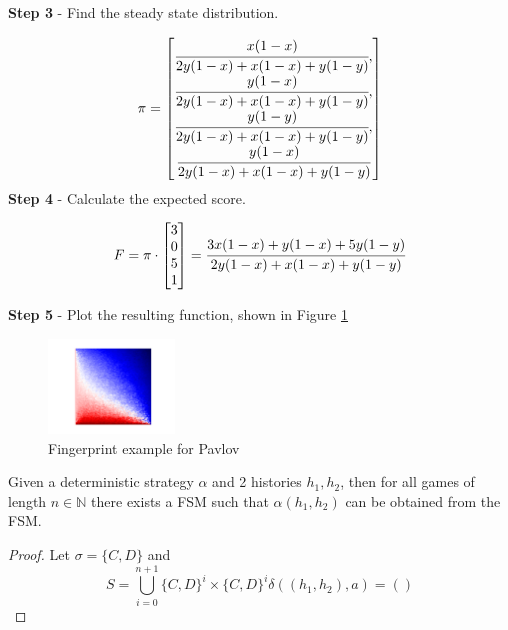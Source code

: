 \textbf{Step 3} - Find the steady state distribution.

\begin{equation}\label{eq:steady_state}
%
\pi =
\begin{bmatrix}
\cfrac{x (1 - x)}{2y(1-x) + x(1-x) + y(1-y)}, \\
\cfrac{y (1 - x)}{2y(1-x) + x(1-x) + y(1-y)}, \\
\cfrac{y (1 - y)}{2y(1-x) + x(1-x) + y(1-y)}, \\
\cfrac{y (1 - x)}{2y(1-x) + x(1-x) + y(1-y)}
\end{bmatrix}
\end{equation}
\textbf{Step 4} - Calculate the expected score.

\begin{equation}
F = \pi \cdot
\begin{bmatrix}
3 \\
0 \\
5 \\
1
\end{bmatrix}
=
\cfrac{3x(1-x) + y(1-x) + 5y(1-y)}{2y(1-x) + x(1-x) + y(1-y)}
\end{equation}

\textbf{Step 5} - Plot the resulting function, shown in Figure \ref{fig:pavlov_fing_ex}

\begin{figure}[htbp!]
\centering
\includegraphics[width = 0.3\textwidth]{../img/Numerical/Win-Stay-Lose-Shift}
\caption{Fingerprint example for Pavlov}
\label{fig:pavlov_fing_ex}
\end{figure}




\begin{theorem}\label{thm:fsm}
Given a deterministic strategy $\alpha$ and 2 histories $h_1, h_2$, then for all games of length $n \in \mathbb{N}$ there exists a FSM such that $\alpha(h_1, h_2)$ can be obtained from the FSM.
\end{theorem}

\begin{proof}\label{prf:fsm}
Let $\sigma = \{C, D\}$ and
\[
S = \bigcup_{i=0}^{n+1} \{C, D\}^i \times \{C, D\}^i
\delta((h_1, h_2), a) =()
\]

\end{proof}


